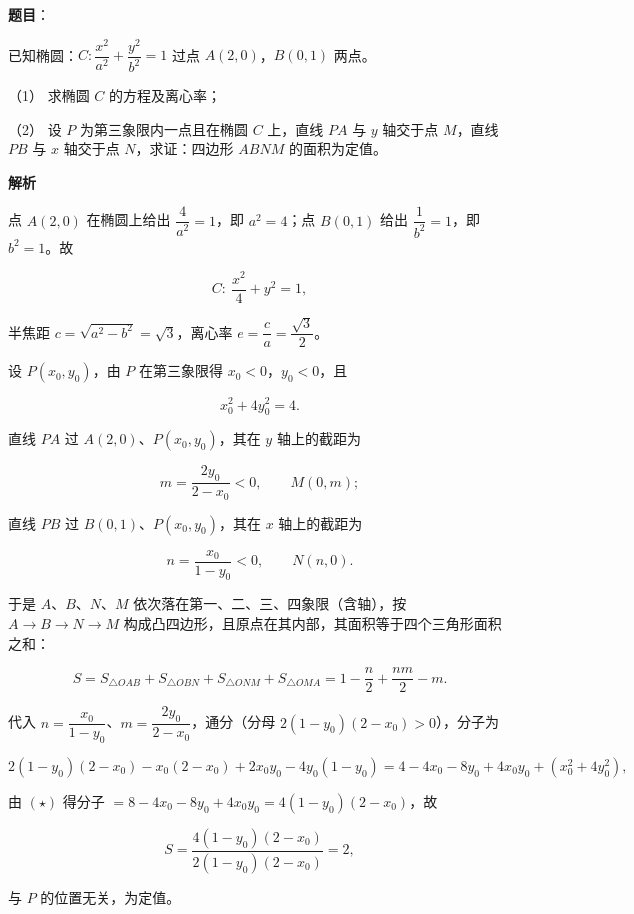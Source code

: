\begin{answer}

\textbf{题目}：

已知椭圆：\(C:\dfrac{x^{2}}{a^{2}}+\dfrac{y^{2}}{b^{2}}=1\) 过点 \(A(2,0)\)，\(B(0,1)\) 两点。

（1） 求椭圆 \(C\) 的方程及离心率；

（2） 设 \(P\) 为第三象限内一点且在椭圆 \(C\) 上，直线 \(PA\) 与 \(y\) 轴交于点 \(M\)，直线 \(PB\) 与 \(x\) 轴交于点 \(N\)，求证：四边形 \(ABNM\) 的面积为定值。

\textbf{解析}


点 \(A(2,0)\) 在椭圆上给出 \(\dfrac{4}{a^{2}}=1\)，即 \(a^{2}=4\)；点 \(B(0,1)\) 给出 \(\dfrac{1}{b^{2}}=1\)，即 \(b^{2}=1\)。故

\nopagebreak[4]
\[
C:\ \frac{x^{2}}{4}+y^{2}=1,
\]

半焦距 \(c=\sqrt{a^{2}-b^{2}}=\sqrt{3}\)，离心率 \(e=\dfrac{c}{a}=\dfrac{\sqrt{3}}{2}\)。


设 \(P(x_0,y_0)\)，由 \(P\) 在第三象限得 \(x_0<0\)，\(y_0<0\)，且

\nopagebreak[4]
\[
x_0^{2}+4y_0^{2}=4. \tag{$\star$}
\]

直线 \(PA\) 过 \(A(2,0)\)、\(P(x_0,y_0)\)，其在 \(y\) 轴上的截距为

\nopagebreak[4]
\[
m=\frac{2y_0}{2-x_0}<0,\qquad M(0,m);
\]

直线 \(PB\) 过 \(B(0,1)\)、\(P(x_0,y_0)\)，其在 \(x\) 轴上的截距为

\nopagebreak[4]
\[
n=\frac{x_0}{1-y_0}<0,\qquad N(n,0).
\]

于是 \(A\)、\(B\)、\(N\)、\(M\) 依次落在第一、二、三、四象限（含轴），按 \(A\to B\to N\to M\) 构成凸四边形，且原点在其内部，其面积等于四个三角形面积之和：

\nopagebreak[4]
\[
S=S_{\triangle OAB}+S_{\triangle OBN}+S_{\triangle ONM}+S_{\triangle OMA}
=1-\frac{n}{2}+\frac{nm}{2}-m.
\]

代入 \(n=\dfrac{x_0}{1-y_0}\)、\(m=\dfrac{2y_0}{2-x_0}\)，通分（分母 \(2(1-y_0)(2-x_0)>0\)），分子为

\nopagebreak[4]
\[
2(1-y_0)(2-x_0)-x_0(2-x_0)+2x_0y_0-4y_0(1-y_0)
=4-4x_0-8y_0+4x_0y_0+(x_0^{2}+4y_0^{2}),
\]

由 \((\star)\) 得分子 \(=8-4x_0-8y_0+4x_0y_0=4(1-y_0)(2-x_0)\)，故

\nopagebreak[4]
\[
S=\frac{4(1-y_0)(2-x_0)}{2(1-y_0)(2-x_0)}=2,
\]

与 \(P\) 的位置无关，为定值。



\end{answer}
